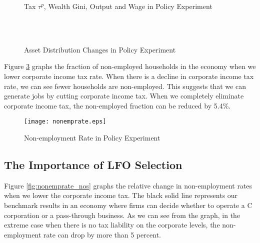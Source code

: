 \documentclass[12pt]{article}
\begin{document}
\begin{figure}[!ht]
	\centering
	\caption{\sc Tax $\tau^p$, Wealth Gini, Output and Wage in Policy Experiment}\label{fig:exp}
	\subfiguretopcaptrue
	\quad
	\subfiguretopcaptrue
	\quad
\end{figure}


\begin{figure}[!ht]
     \centering
     \caption{\sc Asset Distribution Changes in Policy Experiment}\label{fig:assetdistchg}
\subfiguretopcaptrue
{}\\
\subfiguretopcaptrue
{}\\
\subfiguretopcaptrue
{}
\end{figure}

Figure \ref{fig:nonemprate} graphs the fraction of non-employed households in the economy when we lower corporate income tax rate. When there is a decline in corporate income tax rate, we can see fewer households are non-employed. This suggests that we can generate jobs by cutting corporate income tax. When we completely eliminate corporate income tax, the non-employed fraction can be reduced by 5.4\%. 

\begin{figure}[!ht]
\centering
\caption{\sc Non-employment Rate in Policy Experiment }
\texttt{[image: nonemprate.eps]}\label{fig:nonemprate}
\end{figure}

\subsection{The Importance of LFO Selection}

Figure \ref{fig:nonemprate_nos} graphs the relative change in non-employment rates when we lower the corporate income tax. The black solid line represents our benchmark results in an economy where firms can decide whether to operate a C corporation or a pass-through business. As we can see from the graph, in the extreme case when there is no tax liability on the corporate levels, the non-employment rate can drop by more than 5 percent. 
\end{document}
